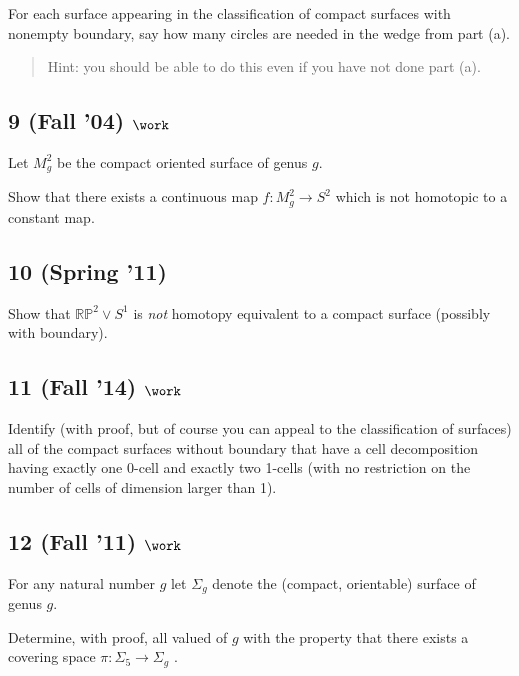 For each surface appearing in the classification of compact surfaces
with nonempty boundary, say how many circles are needed in the wedge
from part (a).

\begin{quote}
Hint: you should be able to do this even if you have not done part (a).
\end{quote}

\hypertarget{fall-04-work-4}{%
\subsection{\texorpdfstring{9 (Fall '04)
\(\work\)}{9 (Fall '04) \textbackslash work}}\label{fall-04-work-4}}

Let \(M_g^2\) be the compact oriented surface of genus \(g\).

Show that there exists a continuous map \(f : M_g^2 \to S^2\) which is
not homotopic to a constant map.

\hypertarget{spring-11}{%
\subsection{10 (Spring '11)}\label{spring-11}}

Show that \({\mathbb{RP}}^2 \lor S^1\) is \emph{not} homotopy equivalent
to a compact surface (possibly with boundary).

\hypertarget{fall-14-work-4}{%
\subsection{\texorpdfstring{11 (Fall '14)
\(\work\)}{11 (Fall '14) \textbackslash work}}\label{fall-14-work-4}}

Identify (with proof, but of course you can appeal to the classification
of surfaces) all of the compact surfaces without boundary that have a
cell decomposition having exactly one 0-cell and exactly two 1-cells
(with no restriction on the number of cells of dimension larger than 1).

\hypertarget{fall-11-work-3}{%
\subsection{\texorpdfstring{12 (Fall '11)
\(\work\)}{12 (Fall '11) \textbackslash work}}\label{fall-11-work-3}}

For any natural number \(g\) let \(\Sigma_g\) denote the (compact,
orientable) surface of genus \(g\).

Determine, with proof, all valued of \(g\) with the property that there
exists a covering space \(\pi : \Sigma_5 \to \Sigma_g\) .

